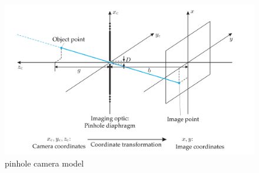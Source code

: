 \begin{figure}
\centering
\includegraphics[width=15cm]{images/camera_model.PNG}
\caption{pinhole camera model}
\label{fig:pinhole camera model}
\end{figure}


